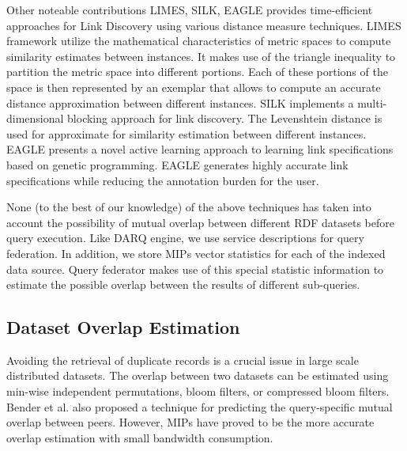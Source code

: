 \documentclass{sig-alternate}  %
\begin{document}
Other noteable contributions LIMES\cite{key-26}, SILK\cite{key-27}, EAGLE\cite{key-28} provides time-efficient approaches for Link Discovery using
various distance measure techniques. LIMES framework utilize the mathematical
characteristics of metric spaces to compute similarity estimates between
instances. It makes use of the triangle inequality to partition the
metric space into different portions. Each of these portions of the
space is then represented by an exemplar\cite{key-33} that allows to compute
an accurate distance approximation between different instances. SILK
implements a multi-dimensional blocking approach for link discovery.
The Levenshtein distance\cite{key-34} is used for approximate for similarity
estimation between different instances. EAGLE presents a novel active
learning approach to learning link specifications based on genetic programming.
EAGLE generates highly accurate link specifications while reducing the
annotation burden for the user. 

None (to the best of our knowledge) of the above techniques has taken into account the possibility of mutual overlap between different RDF datasets before query execution. Like DARQ engine, we use service
descriptions for query federation. In addition, we store MIPs vector
statistics for each of the indexed data source. Query federator makes
use of this special statistic information to estimate the possible
overlap between the results of different sub-queries.

\subsection{Dataset Overlap Estimation}
Avoiding the retrieval of duplicate records is a crucial issue in large scale distributed datasets. The overlap between two datasets can be estimated using min-wise independent
permutations\cite{key-9}, bloom filters\cite{key-10}, or compressed bloom
filters\cite{key-11}. Bender et al.\cite{key-12} also proposed a technique
for predicting the query-specific mutual overlap between peers. However,
MIPs have proved to be the more accurate overlap estimation with small
bandwidth consumption\cite{key-9}.
\end{document}
